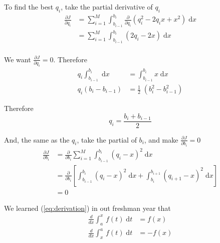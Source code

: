 \documentclass{article}
\begin{document}
To find the best $q_i$, take the partial derivative of $q_i$
\begin{equation*}
	\begin{aligned}
		\frac{\partial J}{\partial q_i} &= \sum_{i = 1}^{M} \int_{b_{i - 1}}^{b_i} \frac{\partial}{\partial q_i} (q_i^2 - 2q_ix + x^2) \; \mathrm{d}x \\
		&= \sum_{i = 1}^{M} \int_{b_{i - 1}}^{b_i} (2 q_i - 2x) \; \mathrm{d}x \\ 
	\end{aligned}
\end{equation*}

We want $\frac{\partial J}{\partial q_i} = 0$. Therefore \\ 
\begin{equation*}
	\begin{aligned}
		 q_i \int_{b_{i - 1}}^{b_i} \; \mathrm{d}x &=  \int_{b_{i - 1}}^{b_i} x \; \mathrm{d}x \\ 
		 q_i (b_i - b_{i - 1}) &= \frac12 \;  (b_i^2 - b_{i - 1}^2) 	 
	\end{aligned}
\end{equation*}

Therefore
\begin{equation}
	q_i = \frac{b_i + b_{i - 1}}{2} 
	\label{eq:qiResult}
\end{equation}

And, the same as the $q_i$, take the partial of $b_i$, and make $\frac{\partial J}{\partial b_i} = 0$
\begin{equation*}
	\begin{aligned}
		\frac{\partial J}{\partial b_i} &= \frac{\partial}{\partial b_i} \sum_{i = 1}^{M} \int_{b_{i - 1}}^{b_i} (q_i - x)^2 \; \mathrm{d}x \\ 
		&= \frac{\partial}{\partial b_i} [\int_{b_{i - 1}}^{b_i} (q_i - x)^2 \; \mathrm{d}x + \int_{b_{i}}^{b_{i + 1}} (q_{i + 1} - x)^2 \; \mathrm{d}x] \\ 
		&= 0
	\end{aligned}
	\label{eq:biCondi}
\end{equation*}

We learned (\ref{eq:derivation}) in out freshman year that
\begin{equation}
\begin{aligned}
	\frac{d}{dx} \int_{a}^{x} \, f(t) \; \mathrm{d}t &= f(x) \\ 
	\frac{d}{dx} \int_{x}^{a} \, f(t) \; \mathrm{d}t &= - f(x)
\end{aligned}
\label{eq:derivation}
\end{equation}
\end{document}

